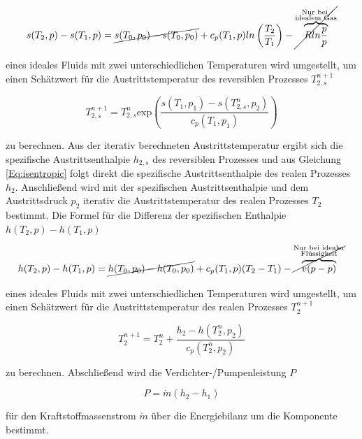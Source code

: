 \begin{equation}\label{Eq:entropy}
	s(T_2,p)-s(T_1, p)=\cancel{s(T_0,p_0) - s(T_0,p_0)} + c_p(T_1,p) ln\left(\frac{T_2}{T_1}\right) - {\cancel{\overbrace{R ln\frac{p}{p}}^{\substack{\text{Nur bei } \\ \text{idealem Gas}}}}}
\end{equation}

eines ideales Fluids mit zwei unterschiedlichen Temperaturen wird umgestellt, um einen Schätzwert für die Austrittstemperatur des reversiblen Prozesses $T_{2,s}^{n+1}$

\begin{equation}\label{Eq:entropy-temperature}
	T_{2,s}^{n+1}=T_{2,s}^n\mathrm{exp}\left(\frac{s(T_1, p_1)-s(T_{2,s}^n, p_2)}{c_p(T_1, p_1)}\right)
\end{equation}

zu berechnen. Aus der iterativ berechneten Austrittstemperatur ergibt sich die spezifische Austrittsenthalpie $h_{2,s}$ des reversiblen Prozesses und aus Gleichung \ref{Eq:isentropic} folgt direkt die spezifische Austrittsenthalpie des realen Prozesses $h_2$. Anschließend wird mit der spezifischen Austrittsenthalpie und dem Austrittsdruck $p_2$ iterativ die Austrittstemperatur des realen Prozesses $T_2$ bestimmt. Die Formel für die Differenz der spezifischen Enthalpie $h(T_2,p)-h(T_1,p)$

\begin{equation}\label{Eq:enthalpy}
	h(T_2,p)-h(T_1,p)=\cancel{h(T_0,p_0) - h(T_0,p_0)} + c_p(T_1,p)(T_2 - T_1) - {\cancel{\overbrace{v(p-p)}^{\substack{\text{Nur bei idealer} \\ \text{Flüssigkeit}}}}}
\end{equation}

eines ideales Fluids mit zwei unterschiedlichen Temperaturen wird umgestellt, um einen Schätzwert für die Austrittstemperatur des realen Prozesses $T_2^{n+1}$

\begin{equation}\label{Eq:enthalpy-temperature}
	T_2^{n+1}=T_2^n+\frac{h_2-h(T_2^n,p_2)}{c_p(T_2^n,p_2)}
\end{equation}

zu berechnen. Abschließend wird die Verdichter-/Pumpenleistung $P$ 

\begin{equation}\label{Eq:power}
	P=\dot{m}(h_2-h_1)
\end{equation}

für den Kraftstoffmassenstrom $\dot{m}$ über die Energiebilanz um die Komponente bestimmt.

